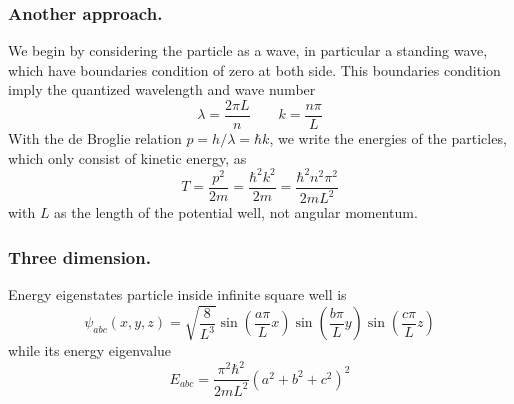 \documentclass[../../../main.tex]{subfiles}
\begin{document}
\subsubsection*{Another approach.} 
We begin by considering the particle as a wave, in particular a standing wave, which have boundaries condition of zero at both side.
This boundaries condition imply the quantized wavelength and wave number
\begin{equation*}
    \lambda=\frac{2\pi L }{n}\qquad k=\frac{n\pi }{L}
\end{equation*}
With the de Broglie relation $p=h/\lambda=\hbar k$, we write the energies of the particles, which only consist of kinetic energy, as 
\begin{equation*}
    T=\frac{p^2 }{2m }=\frac{\hbar^2 k^2 }{2m}=\frac{\hbar^2n^2\pi^2}{2mL^2}
\end{equation*}
with $L$ as the length of the potential well, not angular momentum.

\subsubsection{Three dimension.} Energy eigenstates particle inside infinite square well is
\begin{equation*}
    \psi_{abc}(x,y,z)=\sqrt{\frac{8}{L^3}}\sin( \frac{a \pi }{L}x) \sin( \frac{b \pi }{L}y) \sin( \frac{c \pi }{L}z)
\end{equation*}
while its energy eigenvalue
\begin{equation*}
    E_{abc}=\frac{\pi^2\hbar^2}{2mL^2}(a^2+b^2+c^2)^2
\end{equation*}
\end{document}
